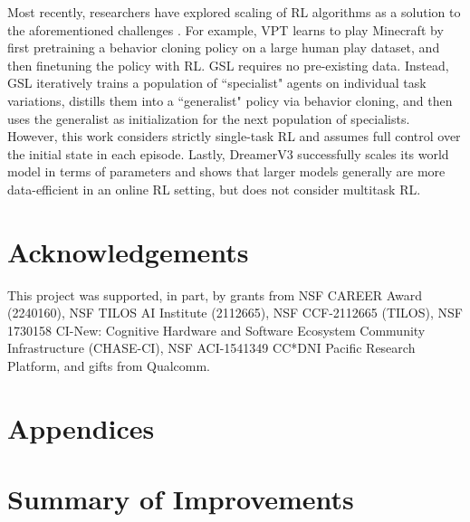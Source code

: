 \documentclass{article}
\begin{document}
Most recently, researchers have explored scaling of RL algorithms as a solution to the aforementioned challenges \citep{baker2022video, jia2022improving, xu2022xtra, kumar2022offline, hafner2023dreamerv3}. For example, VPT \citep{baker2022video} learns to play Minecraft by first pretraining a behavior cloning policy on a large human play dataset, and then finetuning the policy with RL. GSL \citep{jia2022improving} requires no pre-existing data. Instead, GSL iteratively trains a population of ``specialist" agents on individual task variations, distills them into a ``generalist" policy via behavior cloning, and then uses the generalist as initialization for the next population of specialists. However, this work considers strictly single-task RL and assumes full control over the initial state in each episode. Lastly, DreamerV3 \citep{hafner2023dreamerv3} successfully scales its world model in terms of parameters and shows that larger models generally are more data-efficient in an online RL setting, but does not consider multitask RL.

\section*{Acknowledgements}
This project was supported, in part, by grants from NSF CAREER Award (2240160), NSF TILOS AI Institute (2112665), NSF CCF-2112665 (TILOS), NSF 1730158 CI-New: Cognitive Hardware and Software Ecosystem Community Infrastructure (CHASE-CI), NSF ACI-1541349 CC*DNI Pacific Research Platform, and gifts from Qualcomm.





\clearpage
\newpage

\appendix
\section*{Appendices}
\startcontents[appendices]
\newpage


\section{Summary of Improvements}
\label{sec:appendix-tdmpc2-summary}
\end{document}
